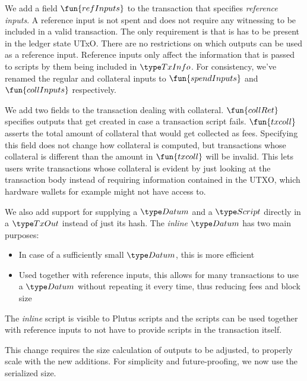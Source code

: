 We add a field $\fun{refInputs}$ to the transaction that specifies
\emph{reference inputs}. A reference input is not spent and does not
require any witnessing to be included in a valid transaction. The only
requirement is that is has to be present in the ledger state
UTxO. There are no restrictions on which outputs can be used as a
reference input. Reference inputs only affect the information that is
passed to scripts by them being included in $\TxInfo$.
For consistency, we've renamed the regular and collateral inputs to
$\fun{spendInputs}$ and $\fun{collInputs}$ respectively.

We add two fields to the transaction dealing with
collateral. $\fun{collRet}$ specifies outputs that get created in case
a transaction script fails. $\fun{txcoll}$ asserts the total amount
of collateral that would get collected as fees. Specifying this field
does not change how collateral is computed, but transactions whose
collateral is different than the amount in $\fun{txcoll}$ will be
invalid. This lets users write transactions whose collateral is
evident by just looking at the transaction body instead of requiring
information contained in the UTXO, which hardware wallets for example
might not have access to.

We also add support for supplying a $\Datum$ and a $\Script$ directly in a $\TxOut$
instead of just its hash. The \emph{inline} $\Datum$ has two main purposes:
\begin{itemize}
\item In case of a sufficiently small $\Datum$, this is more efficient
\item Used together with reference inputs, this allows for many
  transactions to use a $\Datum$ without repeating it every time, thus
  reducing fees and block size
\end{itemize}
The \emph{inline} script is visible to Plutus scripts and the scripts
can be used together with reference inputs to not have to provide
scripts in the transaction itself.

This change requires the size calculation of outputs to be adjusted,
to properly scale with the new additions. For simplicity and
future-proofing, we now use the serialized size.
